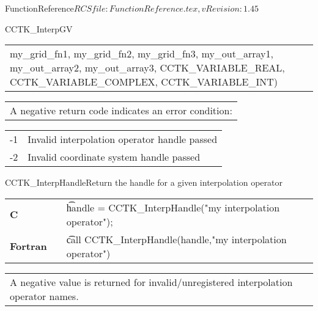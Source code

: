 \begin{cactuspart}{5}{FunctionReference}{$RCSfile: FunctionReference.tex,v $}{$Revision: 1.45 $}
\begin{CCTKFunc}{CCTK\_InterpGV}
\begin{examples}
\begin{tabular}{@{}p{3cm}cp{11cm}}
{\hspace{2ex} my\_grid\_fn1,  my\_grid\_fn2, my\_grid\_fn3,\vfill
\hspace{2ex} my\_out\_array1, my\_out\_array2, my\_out\_array3,\vfill
\hspace{2ex} CCTK\_VARIABLE\_REAL, CCTK\_VARIABLE\_COMPLEX, CCTK\_VARIABLE\_INT)
}
\\
\end{tabular}
\end{examples}
\begin{errorcodes}
\begin{tabular}{l}
A negative return code indicates an error condition:
\end{tabular}
\begin{tabular}{ll}
-1 & Invalid interpolation operator handle passed\\
-2 & Invalid coordinate system handle passed\\
\end{tabular}
\end{errorcodes}
\end{CCTKFunc}


\begin{CCTKFunc}{CCTK\_InterpHandle}{Return the handle for a given interpolation operator}
\label{CCTK-InterpHandle}
\showargs
\begin{params}
\end{params}
\begin{discussion}
\end{discussion}
\begin{examples}
\begin{tabular}{@{}p{3cm}cp{11cm}}
\hfill {\bf C} && {\t handle =  CCTK\_InterpHandle("my interpolation operator");}
\\
\hfill {\bf Fortran} && {\t call CCTK\_InterpHandle(handle,"my interpolation operator")}
\\
\end{tabular}
\end{examples}
\begin{errorcodes}
\begin{tabular}{l}
A negative value is returned for invalid/unregistered interpolation operator names.
\end{tabular}
\end{errorcodes}
\end{CCTKFunc}



\end{cactuspart}

